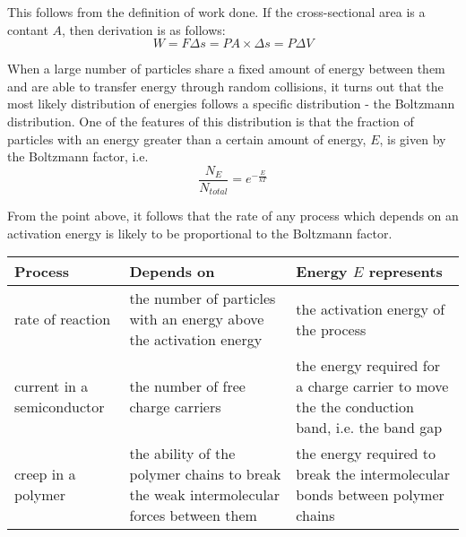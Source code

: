 \documentclass[revision-guide.tex]{subfiles}
\begin{document}

This follows from the definition of work done. If the cross-sectional area is a contant $A$, then derivation is as follows:
\[ W = F\Delta s = PA \times \Delta s = P\Delta V \]


When a large number of particles share a fixed amount of energy between them and are able to transfer energy through random collisions, it turns out that the most likely distribution of energies  follows a specific distribution - the Boltzmann distribution. One of the features of this distribution is that the fraction of particles with an energy greater than a certain amount of energy, $E$, is given by the Boltzmann factor, i.e.
\[ \frac{N_{E}}{N_{total}} = e^{-\frac{E}{kT}} \]

From the point above, it follows that the rate of any process which depends on an activation energy is likely to be proportional to the Boltzmann factor.

\begin{center}
  \begin{tabular}{p{3cm}p{4cm}p{4cm}}
    \textbf{Process} & \textbf{Depends on } & \textbf{Energy $E$ represents} \\ \hline \hline
    rate of reaction & the number of particles with an energy above the activation energy & the activation energy of the process \\ \hline
    current in a semiconductor & the number of free charge carriers & the energy required for a charge carrier to move the the conduction band, i.e. the band gap \\ \hline
    creep in a polymer & the ability of the polymer chains to break the weak intermolecular forces between them & the energy required to break the intermolecular bonds between polymer chains \\ \hline
  \end{tabular}
\end{center}

\end{document}
